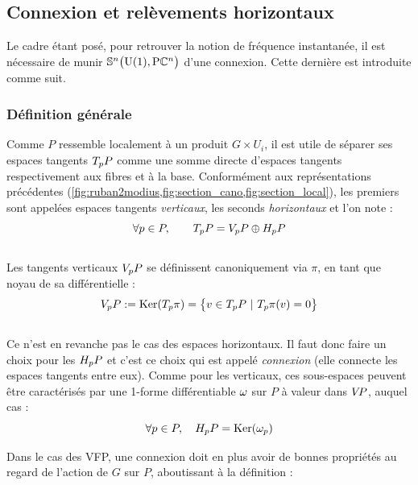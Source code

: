 \subsection{Connexion et relèvements horizontaux}
\label{subsec:connexion2VFP}

Le cadre étant posé, pour retrouver la notion de fréquence instantanée, il est nécessaire de munir $\VFP$ d'une connexion. Cette dernière est introduite comme suit.

\subsubsection{Définition générale}
\label{subsec:def2conn}

Comme $P$ ressemble localement à un produit $G\times U_i$, il est utile de séparer ses espaces tangents $\tg[p]{P}$ comme une somme directe d'espaces tangents respectivement aux fibres et à la base. Conformément aux représentations précédentes (\cref{fig:ruban2modius,fig:section_cano,fig:section_local}), les premiers sont appelées espaces tangents \emph{verticaux}, les seconds \emph{horizontaux} et l'on note :
\[\forall p\in P,\qquad \tg[p]{P} = \vg[p]{P} \oplus \hg[p]{P}\]
\\
Les tangents verticaux $\vg[p]{P}$ se définissent canoniquement via $\pi$, en tant que noyau de sa différentielle :
\[\vg[p]{P} \defeq \Ker (\tg[p]{\pi}) = \big\{ v\in\tg[p]{P}\ |\ \tg[p]{\pi}(v)=0 \big\}\]
\\ 
Ce n'est en revanche pas le cas des espaces horizontaux. Il faut donc faire un choix pour les $\hg[p]{P}$ et c'est ce choix qui est appelé \emph{connexion} (elle connecte les espaces tangents entre eux).
Comme pour les verticaux, ces sous-espaces peuvent être caractérisés par une 1-forme différentiable $\conn$ sur $P$ à valeur dans $\vg{P}$, auquel cas :
\[\forall p\in P,\quad \hg[p]{P} = \Ker(\conn_p)\]
\skipl

Dans le cas des VFP, une connexion doit en plus avoir de bonnes propriétés au regard de l'action de $G$ sur $P$, aboutissant à la définition :

